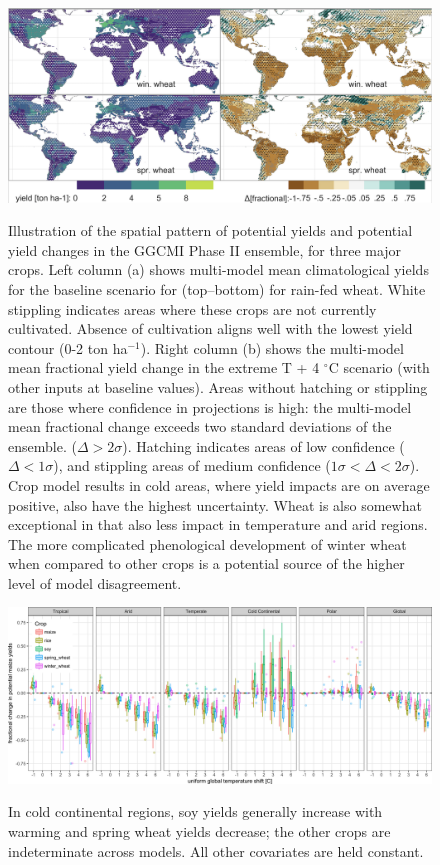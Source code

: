 \documentclass[10pt]{article}
\begin{document}
\begin{figure}[h!]
\includegraphics[width=\textwidth]{s_wheat_baseline.png}\\
\caption{Illustration of the spatial pattern of potential yields and potential yield changes in the GGCMI Phase II ensemble, for three major crops. Left column (a) shows multi-model mean climatological yields for the baseline scenario for (top--bottom) for rain-fed wheat. White stippling indicates areas where these crops are not currently cultivated. Absence of cultivation aligns well with the lowest yield contour (0-2 ton ha$^{-1}$). Right column (b) shows the multi-model mean fractional yield change in the extreme T + 4 $^{\circ}$C scenario (with other inputs at baseline values). Areas without hatching or stippling are those where confidence in projections is high: the multi-model mean fractional change exceeds two standard deviations of the ensemble. ($\Delta > 2\sigma$). Hatching indicates areas of low confidence ($\Delta < 1 \sigma$), and stippling areas of medium confidence ($1 \sigma < \Delta < 2 \sigma$). Crop model results in cold areas, where yield impacts are on average positive, also have the highest uncertainty. Wheat is also somewhat exceptional in that  also less impact in temperature and arid regions. The more complicated phenological development of winter wheat when compared to other crops is a potential source of the higher level of model disagreement.}
\label{fig:wheatbaseline}
\end{figure}


\begin{figure}[h!]
\includegraphics[width=\textwidth]{s_sim_KG_crops_all.png}\\
\caption{In cold continental regions, soy yields generally increase with warming and spring wheat yields decrease; the other crops are indeterminate across models. All other covariates are held constant.}
\label{fig:KGcrops_all}
\end{figure}
\end{document}
